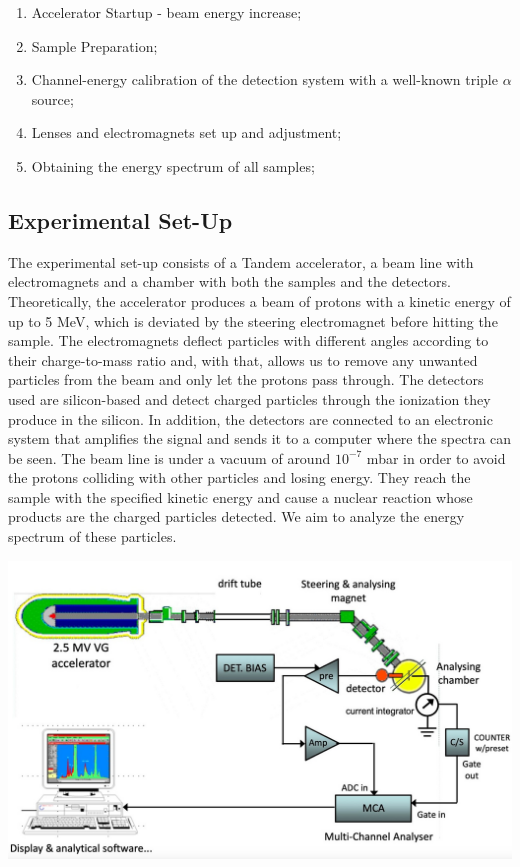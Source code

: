 \documentclass{article}
\begin{document}
\begin{multicols}{2}
\begin{enumerate}
  \item Accelerator Startup - beam energy increase;
  \item Sample Preparation;
  \item Channel-energy calibration of the detection system with a well-known triple $\alpha$ source;
  \item Lenses and electromagnets set up and adjustment;
  \item Obtaining the energy spectrum of all samples;
\end{enumerate}

\subsection{Experimental Set-Up}
    \label{sec:setup}

The experimental set-up consists of a Tandem accelerator, a beam line with electromagnets and a chamber with both the samples and the detectors.
Theoretically, the accelerator produces a beam of protons with a kinetic energy of up to 5 MeV, which is deviated by the steering electromagnet before hitting the sample. 
The electromagnets deflect particles with different angles according to their charge-to-mass ratio and, with that, allows us to remove any unwanted particles from the beam and only let the protons pass through.
The detectors used are silicon-based and detect charged particles through the ionization they produce in the silicon.
In addition, the detectors are connected to an electronic system that amplifies the signal and sends it to a computer where the spectra can be seen.
The beam line is under a vacuum of around $10^{-7}$ mbar in order to avoid the protons colliding with other particles and losing energy. 
They reach the sample with the specified kinetic energy and cause a nuclear reaction whose products are the charged particles detected. 
We aim to analyze the energy spectrum of these particles.

\begin{center}
    \label{TT_21}
    \centering
    \includegraphics[scale = 0.15]{../images/scheme.jpeg} 
\end{center}


\end{multicols}
\end{document}
